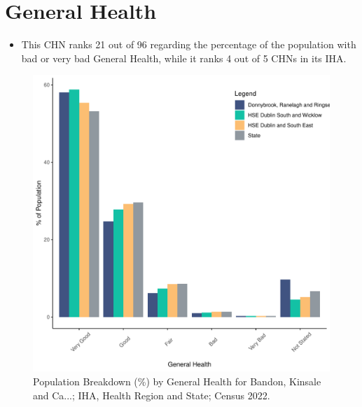 \documentclass{article}
\begin{document}
\pagebreak

\section{General Health}\label{sect:GenHealth}
\begin{itemize}
\item  This CHN ranks  21 out of 96 regarding the percentage of the population with bad or very bad General Health, while it ranks   4 out of 5 CHNs in its IHA.
\end{itemize}
\begin{figure}[h]
	\centering
	\includegraphics[width = 150mm]{../figures/GenED.pdf}
	\caption{Population Breakdown (\%) by General Health for Bandon, Kinsale and Ca...; IHA, Health Region and State;  Census 2022.}
	\label{fig:2ae19629-1a6a-13a3-e055-000000000001}
	\end{figure}
\end{document}
